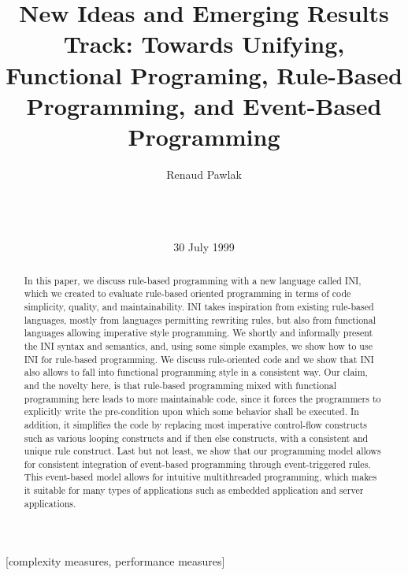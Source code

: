 \documentclass{sig-alternate}
\begin{document}
\title{New Ideas and Emerging Results Track: Towards Unifying, Functional Programing, Rule-Based Programming, and Event-Based Programming}

\author{
\alignauthor
Renaud Pawlak\\
       \\
       \\
       \\
}
\date{30 July 1999}

\maketitle
\begin{abstract}
In this paper, we discuss rule-based programming with a new language called INI, which we created to evaluate rule-based oriented programming in terms of code simplicity, quality, and maintainability. INI takes inspiration from existing rule-based languages, mostly from languages permitting rewriting rules, but also from functional languages allowing imperative style programming. We shortly and informally present the INI syntax and semantics, and, using some simple examples, we show how to use INI for rule-based programming. We discuss rule-oriented code and we show that INI also allows to fall into functional programming style in a consistent way. Our claim, and the novelty here, is that rule-based programming mixed with functional programming here leads to more maintainable code, since it forces the programmers to explicitly write the pre-condition upon which some behavior shall be executed. In addition, it simplifies the code by replacing most imperative control-flow constructs such as various looping constructs and if then else constructs, with a consistent and unique rule construct. Last but not least, we show that our programming model allows for consistent integration of event-based programming through event-triggered rules. This event-based model allows for intuitive multithreaded programming, which makes it suitable for many types of applications such as embedded application and server applications. 
\end{abstract}

[complexity measures, performance measures]
\end{document}
